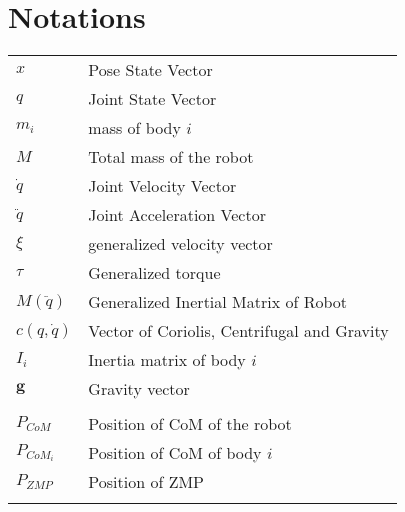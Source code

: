\documentclass{thesisreport}
\begin{document}




 
 
\section*{Notations}
    \begin{tabular}{p{3cm}p{10cm}}
        $x$ & Pose State Vector \\
        $q$ & Joint State Vector \\
        $m_i$ & mass of body $i$ \\
        $M$ & Total mass of the robot \\
        $\dot{q}$ & Joint Velocity Vector \\
        $\ddot{q}$ & Joint Acceleration Vector \\
        $\xi$ & generalized velocity vector \\
        $\tau$ & Generalized torque \\
        $M(\ddot{q})$ & Generalized Inertial Matrix of Robot \\
        $c(q, \dot{q})$ & Vector of Coriolis, Centrifugal and Gravity \\
        $I_i$ & Inertia matrix of body $i$ \\
        $\mathbf{g}$ & Gravity vector \\
         & \\
        $P_{CoM}$ & Position of CoM of the robot \\
        $P_{CoM_i}$ & Position of CoM of body $i$ \\
        $P_{ZMP}$ & Position of ZMP \\
         & \\
        



    \end{tabular}
\end{document}
